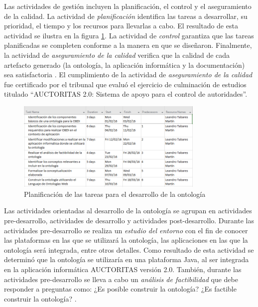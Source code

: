 Las actividades de gestión incluyen la planificación, el control y el aseguramiento de la calidad. La actividad de \textit{planificación} identifica las tareas a desarrollar, su prioridad, el tiempo y los recursos para llevarlas a cabo. El resultado de esta actividad se ilustra en la figura \ref{fig: planificacion}. La actividad de \textit{control} garantiza que las tareas planificadas se completen conforme a la manera en que se diseñaron. Finalmente, la actividad de \textit{aseguramiento de la calidad} verifica que la calidad de cada artefacto generado (la ontología, la aplicación informática y la documentación) sea satisfactoria \citep{Gomez-Perez:2007:OEE:1199560}. El cumplimiento de la actividad de \textit{aseguramiento de la calidad} fue certificado por el tribunal que evaluó el ejercicio de culminación de estudios titulado ``AUCTORITAS 2.0: Sistema de apoyo para el control de autoridades''.

\begin{figure}
\begin{center}
	\includegraphics[width=0.8\textwidth]{img/planificacionTareas.PNG}
\end{center}
\caption{Planificación de las tareas para el desarrollo de la ontología}
\label{fig: planificacion}
\end{figure}

Las actividades orientadas al desarrollo de la ontología se agrupan en actividades pre-desarrollo, actividades de desarrollo y actividades post-desarrollo. Durante las actividades pre-desarrollo se realiza un \textit{estudio del entorno} con el fin de conocer las plataformas en las que se utilizará la ontología, las aplicaciones en las que la ontología será integrada, entre otros detalles. Como resultado de esta actividad se determinó que la ontología se utilizaría en una plataforma Java, al ser integrada en la aplicación informática AUCTORITAS versión 2.0. También, durante las actividades pre-desarrollo se lleva a cabo un \textit{análisis de factibilidad} que debe responder a preguntas como: ¿Es posible construir la ontología? ¿Es factible construir la ontología? \citep{Gomez-Perez:2007:OEE:1199560}.

